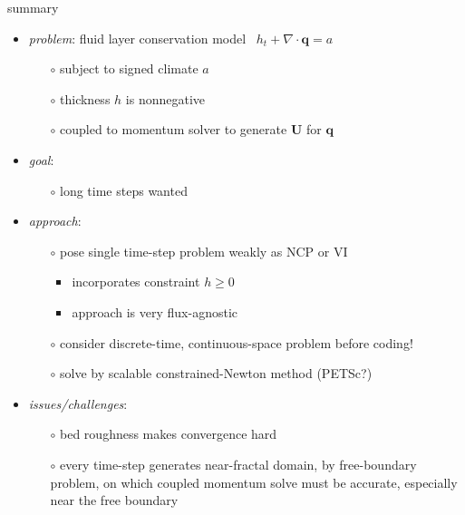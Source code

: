 \documentclass[xcolor={dvipsnames}]{beamer}
\newcommand\bq{\mathbf{q}}
\newcommand\bU{\mathbf{U}}
\newcommand\Div{\nabla\cdot}
\begin{document}
\begin{frame}{summary}

  \begin{itemize}
  \item \emph{problem}: fluid layer conservation model \, $h_t + \Div\bq = a$
    \begin{itemize}
    \item[$\circ$]  subject to signed climate $a$
    \item[$\circ$]  thickness $h$ is nonnegative
    \item[$\circ$]  coupled to momentum solver to generate $\bU$ for $\bq$
    \end{itemize}
  \item \emph{goal}:
    \begin{itemize}
    \item[$\circ$]  long time steps wanted
    \end{itemize}
  \item \emph{approach}:
    \begin{itemize}
    \item[$\circ$]  pose single time-step problem weakly as NCP or VI
      \begin{itemize}
      \item  incorporates constraint $h\ge 0$
      \item  approach is very flux-agnostic
      \end{itemize}
    \item[$\circ$]  consider discrete-time, continuous-space problem before coding!
    \item[$\circ$]  solve by scalable constrained-Newton method (PETSc?)
    \end{itemize}
  \item \emph{issues/challenges}:
    \begin{itemize}
    \item[$\circ$]  bed roughness makes convergence hard
    \item[$\circ$]  \alert{every time-step generates near-fractal domain, by free-boundary problem, on which coupled momentum solve must be accurate, especially near the free boundary}
    \end{itemize}
  \end{itemize}

\end{frame}
\end{document}

